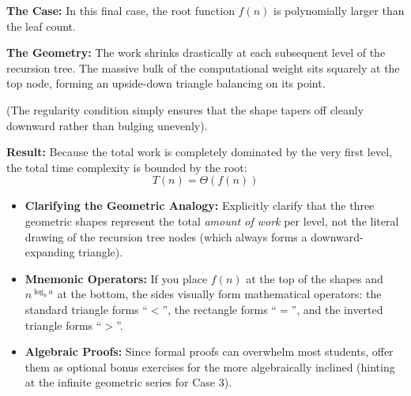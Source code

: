 \textbf{The Case:} In this final case, the root function $f(n)$ is polynomially larger than the leaf count.

\textbf{The Geometry:}  The work shrinks drastically at each subsequent level of the recursion tree. The massive bulk of the computational weight sits squarely at the top node, forming an upside-down triangle balancing on its point. 

(The regularity condition simply ensures that the shape tapers off cleanly downward rather than bulging unevenly).

\textbf{Result:} Because the total work is completely dominated by the very first level, the total time complexity is bounded by the root:
\begin{equation*}
    T(n) = \Theta(f(n))
\end{equation*}

\vspace{0.5cm}
\begin{center}
\end{center}

\vspace{1cm}
\begin{educatortip}
\begin{itemize}
    \item \textbf{Clarifying the Geometric Analogy:} Explicitly clarify that the three geometric shapes represent the total \textit{amount of work} per level, not the literal drawing of the recursion tree nodes (which always forms a downward-expanding triangle).
    \item \textbf{Mnemonic Operators:} If you place $f(n)$ at the top of the shapes and $n^{\log_b a}$ at the bottom, the sides visually form mathematical operators: the standard triangle forms ``$<$'', the rectangle forms ``$=$'', and the inverted triangle forms ``$>$''.
    \item \textbf{Algebraic Proofs:} Since formal proofs can overwhelm most students, offer them as optional bonus exercises for the more algebraically inclined (hinting at the infinite geometric series for Case 3).
\end{itemize}
\end{educatortip}


